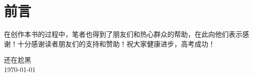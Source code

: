 \documentclass[12pt,a4paper, oneside,UTF8]{ctexbook}
\begin{document}

\frontmatter
\pagestyle{frontmatter} %
\chapter*{前言}
在创作本书的过程中，笔者也得到了朋友们和热心群众的帮助，在此向他们表示感谢！十分感谢读者朋友们的支持和赞助！祝大家健康进步，高考成功！
\begin{flushright}
    \vspace{2\baselineskip} %
    \kt 还在尬黑 \\ %
    \today
\end{flushright}

\newpage
{}%
\tableofcontents
\thispagestyle{tocmatter} 
\mainmatter
\pagestyle{mainmatter} %



\end{document}
